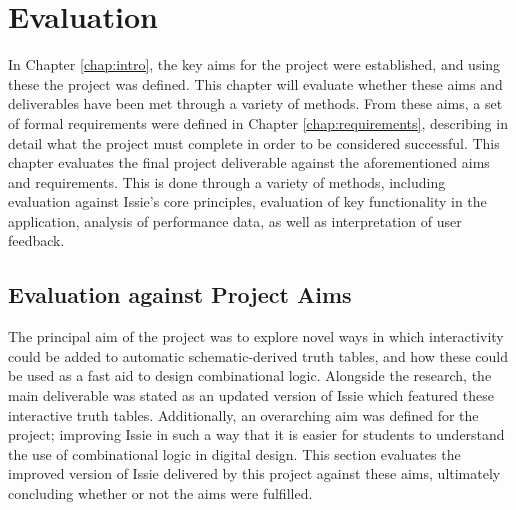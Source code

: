 \chapter{Evaluation}
In Chapter \ref{chap:intro}, the key aims for the project were established, and using these the project was defined. This chapter will evaluate whether these aims and deliverables have been met through a variety of methods. From these aims, a set of formal requirements were defined in Chapter \ref{chap:requirements}, describing in detail what the project must complete in order to be considered successful. This chapter evaluates the final project deliverable against the aforementioned aims and requirements. This is done through a variety of methods, including evaluation against Issie's core principles, evaluation of key functionality in the application, analysis of performance data, as well as interpretation of user feedback. 

\section{Evaluation against Project Aims}
The principal aim of the project was to explore novel ways in which interactivity could be added to automatic schematic-derived truth tables, and how these could be used as a fast aid to design combinational logic. Alongside the research, the main deliverable was stated as an updated version of Issie which featured these interactive truth tables. Additionally, an overarching aim was defined for the project; improving Issie in such a way that it is easier for students to understand the use of combinational logic in digital design. This section evaluates the improved version of Issie delivered by this project against these aims, ultimately concluding whether or not the aims were fulfilled.

